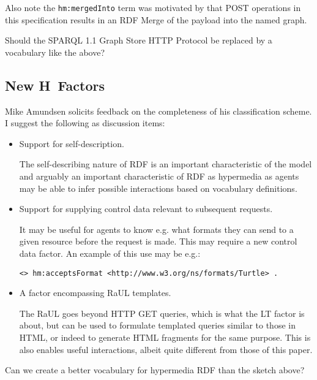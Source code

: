 \documentclass{llncs}
\begin{document}
Also note the \texttt{hm:mergedInto} term was motivated by that POST
operations in this specification results in an RDF Merge of the
payload into the named graph. 

\begin{question}
Should the SPARQL 1.1 Graph Store HTTP Protocol be replaced by a
vocabulary like the above?
\end{question}

\subsection{New H~Factors}

Mike Amundsen solicits feedback on the completeness of his
classification scheme. I suggest the following as discussion items:

\begin{itemize}

\item Support for self-description.

The self-describing nature of RDF is an important characteristic of
the model and arguably an important characteristic of RDF as
hypermedia as agents may be able to infer possible interactions based
on vocabulary definitions.

\item Support for supplying control data relevant to subsequent requests.

It may be useful for agents to know e.g. what formats they can send to
a given resource before the request is made. This may require a new
control data factor. An example of this use may be e.g.:

\begin{verbatim}
<> hm:acceptsFormat <http://www.w3.org/ns/formats/Turtle> .
\end{verbatim}

\item A factor encompassing RaUL templates. 

  The RaUL\cite{raul} goes beyond HTTP GET queries, which is what the
  \textsf{LT} factor is about, but can be used to formulate templated
  queries similar to those in HTML, or indeed to generate HTML
  fragments for the same purpose. This is also enables useful
  interactions, albeit quite different from those of this paper.


\end{itemize}


\begin{question}
Can we create a better vocabulary for hypermedia RDF than the sketch above?
\end{question}
\end{document}
